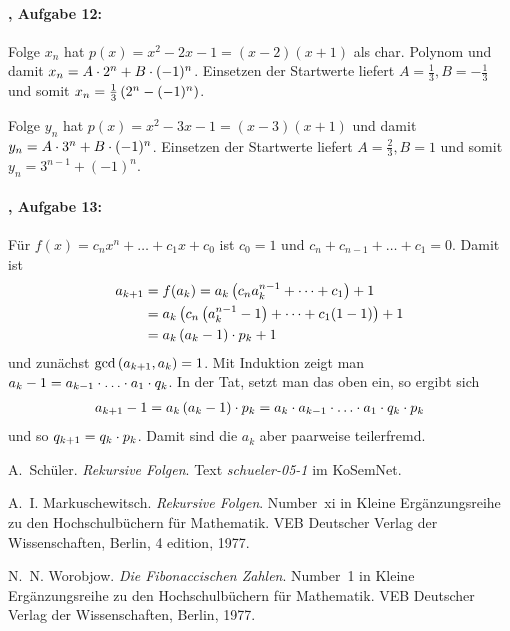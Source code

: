 \documentclass[11pt,a4paper]{article}
\begin{document}
\paragraph{\cite{S}, Aufgabe 12:}
Folge $x_n$ hat $p(x)=x^2-2x-1=(x-2)(x+1)$ als char. Polynom und damit
$x_n=A\cdot2^n+B\cdot(-1)^n$.  Einsetzen der Startwerte liefert $A=\frac13,
B=-\frac13$ und somit $x_n=\frac13\left(2^n-(-1)^n\right)$.

Folge $y_n$ hat $p(x)=x^2-3x-1=(x-3)(x+1)$ und damit $y_n=A\cdot3^n+B\cdot(-1)^n$.
Einsetzen der Startwerte liefert $A=\frac23, B=1$ und somit
$y_n=3^{n-1}+(-1)^n$.

\paragraph{\cite{S}, Aufgabe 13:}
Für $f(x)=c_nx^n+\dots+c_1x+c_0$ ist $c_0=1$ und $c_n+c_{n-1}+\dots+c_1=0$.
Damit ist
\begin{align*}
  a_{k+1}&=f(a_k)=a_k\left(c_na_k^{n-1}+\dots+c_1\right)+1\\
  &=a_k\left(c_n\left(a_k^{n-1}-1\right)+\dots+c_1(1-1)\right)+1\\
  &=a_k\left(a_k-1\right)\cdot p_k+1
\end{align*}
und zunächst $\gcd\left(a_{k+1},a_k\right)=1$.  Mit Induktion zeigt man
$a_k-1=a_{k-1}\m\dots\m a_1\m q_k$.  In der Tat, setzt man das oben ein, so
ergibt sich 
\begin{gather*}
  a_{k+1}-1=a_k\br{a_k-1}\m p_k=a_k\m a_{k-1}\m\dots\m a_1\m q_k\m p_k
\end{gather*}
und so $q_{k+1}=q_k\cdot p_k$.  Damit sind die $a_k$ aber paarweise
teilerfremd. 

\begin{thebibliography}{Wor77}

 A.~Schüler.  \newblock \emph{Rekursive Folgen}.  Text
  \emph{schueler-05-1} im KoSemNet.

 A.~I. Markuschewitsch.  \newblock
  \emph{{R}ekursive {F}olgen}.  \newblock Number~xi in Kleine
  Erg{\"a}nzungsreihe zu den Hochschulb{\"u}chern f{\"u}r Mathematik. VEB
  Deutscher Verlag der Wissenschaften, Berlin, 4 edition, 1977.

 N.~N. Worobjow.  \newblock \emph{Die Fibonaccischen
  Zahlen}.  \newblock Number~1 in Kleine Erg{\"a}nzungsreihe zu den
  Hochschulb{\"u}chern f{\"u}r Mathematik. VEB Deutscher Verlag der
  Wissenschaften, Berlin, 1977.

\end{thebibliography}
\end{document}
